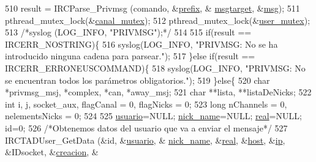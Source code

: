 \begin{DoxyCode}
{{{{{{{{{510                         result = IRCParse\_Privmsg (comando, &\hyperlink{_g-2361-06-_p1-_server_8c_ad2849cf781a4db22cc1b31eaaee50a4f}{prefix}, &
      \hyperlink{_g-2361-06-_p1-_server_8c_a968dcc7e43caeca7959f3c069dcccc6a}{msgtarget}, &\hyperlink{_g-2361-06-_p1-_server_8c_a32d2f5216cddb59c7cc8fb2806a7e727}{msg}); 
511                 pthread\_mutex\_lock(&\hyperlink{_g-2361-06-_p1-_server_8c_ab86a544a49de18195048bac54dd3ac3e}{canal\_mutex});
512                         pthread\_mutex\_lock(&\hyperlink{_g-2361-06-_p1-_server_8c_a5dedd07a1144d2ab70b74a8e64b6a7c0}{user\_mutex});
513                 \textcolor{comment}{/*syslog (LOG\_INFO, "PRIVMSG");*/}
514 
515                 \textcolor{keywordflow}{if}(result == IRCERR\_NOSTRING)\{
516                                 syslog(LOG\_INFO, \textcolor{stringliteral}{"PRIVMSG: No se ha introducido ninguna cadena para
       parsear."});
517                         \}\textcolor{keywordflow}{else} \textcolor{keywordflow}{if}(result == IRCERR\_ERRONEUSCOMMAND)\{
518                                 syslog(LOG\_INFO, \textcolor{stringliteral}{"PRIVMSG: No se encuentran todos los parámetros
       obligatorios."});
519                         \}\textcolor{keywordflow}{else}\{
520                                 \textcolor{keywordtype}{char} *privmsg\_msj, *complex, *can, *away\_msj;
521                                 \textcolor{keywordtype}{char} **lista, **listaDeNicks;
522                                 \textcolor{keywordtype}{int} i, j, socket\_aux, flagCanal = 0, flagNicks = 0;
523                                 \textcolor{keywordtype}{long} nChannels = 0, nelementsNicks = 0;
524 
525                                 \hyperlink{_g-2361-06-_p1-_server_8c_a0147a5b81499984f9cb00379a8cb84af}{usuario}=NULL; \hyperlink{_g-2361-06-_p1-_server_8c_aabbf66718cda228b924a4a9441eadf62}{nick\_name}=NULL; 
      \hyperlink{_g-2361-06-_p1-_server_8c_af832f551e1c343666c3d2a55834139a0}{real}=NULL; \textcolor{keywordtype}{id}=0;
526                                 \textcolor{comment}{/*Obtenemos datos del usuario que va a enviar el mensaje*/}
527                                 IRCTADUser\_GetData (&\textcolor{keywordtype}{id}, &\hyperlink{_g-2361-06-_p1-_server_8c_a0147a5b81499984f9cb00379a8cb84af}{usuario}, &
      \hyperlink{_g-2361-06-_p1-_server_8c_aabbf66718cda228b924a4a9441eadf62}{nick\_name}, &\hyperlink{_g-2361-06-_p1-_server_8c_af832f551e1c343666c3d2a55834139a0}{real}, &\hyperlink{_g-2361-06-_p1-_server_8c_a1c2046dcb30a629d6d9f45ff8f403f12}{host}, &\hyperlink{_g-2361-06-_p1-_server_8c_afbc356cd0e25d1dbbece7c10fd025fa6}{ip}, &IDsocket, &\hyperlink{_g-2361-06-_p1-_server_8c_a26292066ca0d17922eadee4161542ab9}{creacion}, &
}}}}}}}}}
\end{DoxyCode}
